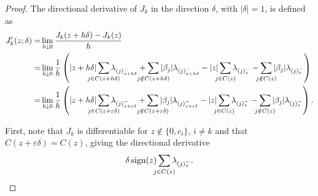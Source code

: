\begin{proof}
  The directional derivative of \(J_k\) in the direction \(\delta\), with
  \(|\delta| = 1\), is defined as
  \begin{align}
    J_k'(z; \delta)
    = & \lim_{h \downarrow 0} \frac{J_k(z + h \delta) - J_k(z)}{h} \nonumber \\
    = &
    \lim_{h \downarrow 0} \frac{1}{h}
    \left(
      |z + h \delta| \smashoperator{\sum_{j \in C(z + h \delta)}} \lambda_{(j)^-_{z + h \delta}}
      + \smashoperator{\sum_{j \notin C(z + h\delta)}} |\beta_j| \lambda_{(j)^-_{z + h \delta}}
      - |z| \smashoperator{\sum_{j \in C(z)}} \lambda_{(j)^-_z}
      - \smashoperator{\sum_{j \notin C(z)}} |\beta_j| \lambda_{(j)^-_z}
    \right) \nonumber                                                        \\
    = & \lim_{h \downarrow 0}
    \frac{1}{h}
    \left(
      |z + h \delta| \smashoperator{\sum_{j \in C(z + \varepsilon\delta)}} \lambda_{(j)^-_{z + \varepsilon\delta}}
      + \smashoperator{\sum_{j \notin C(z + \varepsilon\delta)}} |\beta_j| \lambda_{(j)^-_{z + \varepsilon\delta}}
      - |z| \smashoperator{\sum_{j \in C(z)}} \lambda_{(j)^-_{z}}
      - \smashoperator{\sum_{j \notin C(z)}} |\beta_j| \lambda_{(j)^-_{z}}
    \right).
    \label{eq:directional-derivative-sl1}
  \end{align}

  First, note that \(J_k\) is differentiable for \(z \notin \{0, c_i\}\), \(i
  \neq k\) and that \(C(z + \varepsilon\delta) = C(z)\), giving
  the directional derivative
  \[
    \delta \sign(z) \smashoperator{\sum_{j \in C(z)}} \lambda_{(j)^-_{z}}.
  \]


\end{proof}
